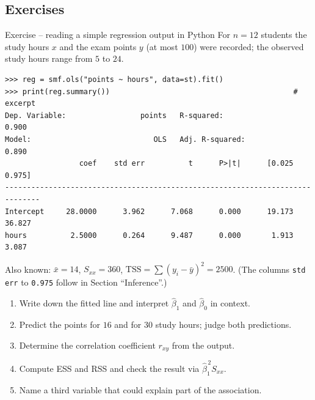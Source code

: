 \documentclass[aspectratio=169,11pt]{beamer}
\begin{document}
\subsection{Exercises}

\begin{frame}[fragile]{Exercise -- reading a simple regression output in Python}
  \footnotesize
  For $n=12$ students the study hours $x$ and the exam points $y$ (at most
  $100$) were recorded; the observed study hours range from $5$ to $24$.
\begin{lstlisting}[style=Pyout]
>>> reg = smf.ols("points ~ hours", data=st).fit()
>>> print(reg.summary())                                          # excerpt
Dep. Variable:                 points   R-squared:                       0.900
Model:                            OLS   Adj. R-squared:                  0.890
                 coef    std err          t      P>|t|      [0.025      0.975]
------------------------------------------------------------------------------
Intercept     28.0000      3.962      7.068      0.000      19.173      36.827
hours          2.5000      0.264      9.487      0.000       1.913       3.087
\end{lstlisting}
  Also known: $\bar x=14$, $S_{xx}=360$, $\text{TSS}=\sum(y_i-\bar y)^2=2500$.
  (The columns \texttt{std err} to \texttt{0.975} follow in Section ``Inference''.)
  \begin{enumerate}
    \setlength{\itemsep}{0pt}
    \item Write down the fitted line and interpret $\hat\beta_1$ and $\hat\beta_0$
          in context.
    \item Predict the points for $16$ and for $30$ study hours; judge both
          predictions.
    \item Determine the correlation coefficient $r_{xy}$ from the output.
    \item Compute ESS and RSS and check the result via $\hat\beta_1^{\,2}S_{xx}$.
    \item Name a third variable that could explain part of the association.
  \end{enumerate}
\end{frame}
\end{document}
